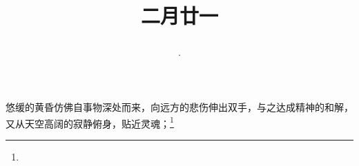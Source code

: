 \title{\date[d=30,m=3,y=2024][year:cn-y,年,month:cn,day:cn,日,·,weekday]·二月廿一 }
悠缓的黄昏仿佛自事物深处而来，向远方的悲伤伸出双手，与之达成精神的和解，又从天空高阔的寂静俯身，贴近灵魂；\footnote{ }

